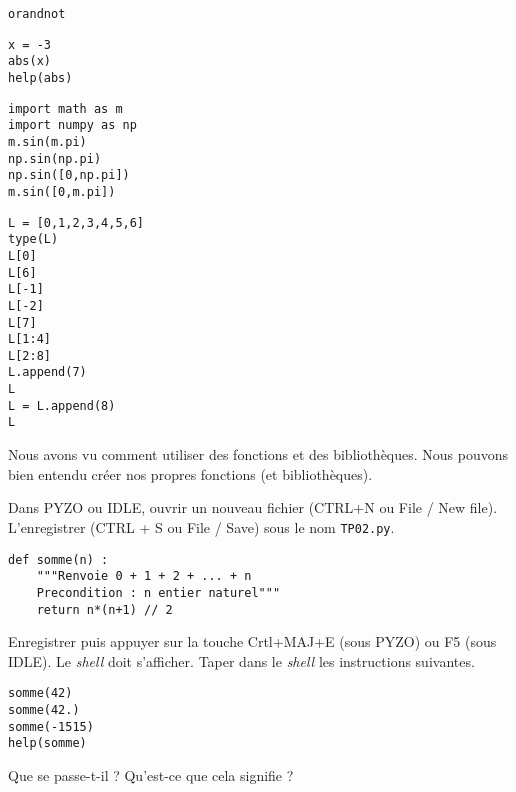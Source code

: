 \medskip{}

\begin{center}
  \texttt{or}\qquad\texttt{and}\qquad\texttt{not}
\end{center}



\begin{lstlisting}
x = -3
abs(x)
help(abs)
\end{lstlisting}



\begin{lstlisting}
import math as m
import numpy as np
m.sin(m.pi)
np.sin(np.pi)
np.sin([0,np.pi])
m.sin([0,m.pi])
\end{lstlisting}




\begin{lstlisting}
L = [0,1,2,3,4,5,6]
type(L)
L[0]
L[6]
L[-1]
L[-2]
L[7]
L[1:4]
L[2:8]
L.append(7)
L
L = L.append(8)
L
\end{lstlisting}



Nous avons vu comment utiliser des fonctions et des bibliothèques. Nous pouvons bien entendu créer nos propres fonctions (et bibliothèques). 

Dans PYZO ou IDLE, ouvrir un nouveau fichier (CTRL+N ou File / New file). L'enregistrer (CTRL + S ou File / Save) sous le nom \texttt{TP02.py}. 


\begin{lstlisting}
def somme(n) : 
    """Renvoie 0 + 1 + 2 + ... + n
    Precondition : n entier naturel"""
    return n*(n+1) // 2 
\end{lstlisting}
Enregistrer puis appuyer sur la touche Crtl+MAJ+E (sous PYZO) ou F5 (sous IDLE).
Le \emph{shell} doit s'afficher. 
Taper dans le \emph{shell} les instructions suivantes. 
\begin{lstlisting}
somme(42)
somme(42.)
somme(-1515)
help(somme)
\end{lstlisting}
Que se passe-t-il ? Qu'est-ce que cela signifie ?


